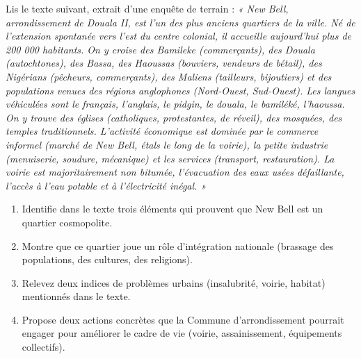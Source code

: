 \documentclass[11pt]{article}
\newcommand{\cle}[1]{{\popxbold\color{popdark}#1}}
\begin{document}
\begin{exercice}
Lis le texte suivant, extrait d'une enquête de terrain : 
\emph{« New Bell, arrondissement de Douala II, est l'un des plus anciens quartiers de la ville. Né de l'extension spontanée vers l'est du centre colonial, il accueille aujourd'hui plus de 200 000 habitants. On y croise des Bamileke (commerçants), des Douala (autochtones), des Bassa, des Haoussas (bouviers, vendeurs de bétail), des Nigérians (pêcheurs, commerçants), des Maliens (tailleurs, bijoutiers) et des populations venues des régions anglophones (Nord-Ouest, Sud-Ouest). Les langues véhiculées sont le français, l'anglais, le pidgin, le douala, le bamiléké, l'haoussa. On y trouve des églises (catholiques, protestantes, de réveil), des mosquées, des temples traditionnels. L'activité économique est dominée par le commerce informel (marché de New Bell, étals le long de la voirie), la petite industrie (menuiserie, soudure, mécanique) et les services (transport, restauration). La voirie est majoritairement non bitumée, l'évacuation des eaux usées défaillante, l'accès à l'eau potable et à l'électricité inégal. »}

\begin{enumerate}
    \item Identifie dans le texte trois éléments qui prouvent que New Bell est un \cle{quartier cosmopolite}.
    \item Montre que ce quartier joue un rôle d'\cle{intégration nationale} (brassage des populations, des cultures, des religions).
    \item Relevez deux indices de \cle{problèmes urbains} (insalubrité, voirie, habitat) mentionnés dans le texte.
    \item Propose deux actions concrètes que la Commune d'arrondissement pourrait engager pour améliorer le cadre de vie (voirie, assainissement, équipements collectifs).
\end{enumerate}
\end{exercice}
\end{document}
